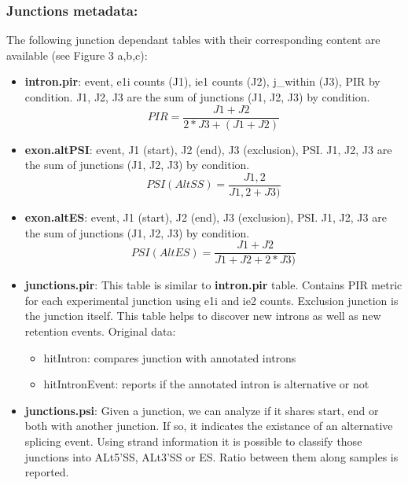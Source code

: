 \documentclass{article}
\begin{document}
\subsubsection*{Junctions metadata:}
The following junction dependant tables with their corresponding content are available (see Figure 3 a,b,c):
\begin{itemize}
\item \textbf{intron.pir}: event, e1i counts (J1), ie1 counts (J2), j\_within (J3), PIR by condition. J1, J2, J3 are the sum of junctions (J1, J2, J3) by condition.
  \[ PIR =\frac{J1+J2}{2*J3+(J1+J2)}\]

\item \textbf{exon.altPSI}: event, J1 (start), J2 (end), J3 (exclusion), PSI. J1, J2, J3 are the sum of junctions (J1, J2, J3) by condition. \\

\[ PSI(AltSS)=\frac{J1,2}{J1,2 +J3)}\]

\item \textbf{exon.altES}: event, J1 (start), J2 (end), J3 (exclusion), PSI. J1, J2, J3 are the sum of junctions (J1, J2, J3) by condition. \\

\[PSI(AltES)=\frac{J1 + J2 }{J1 + J2 +2*J3)}\]

\item \textbf{junctions.pir}: This table is similar to \textbf{intron.pir} table. Contains PIR metric for each experimental junction using e1i and ie2 counts. Exclusion junction is the junction itself. This table helps to discover new introns as well as new retention events. Original data:

\begin{itemize}
\item hitIntron: compares junction with annotated introns
\item hitIntronEvent: reports if the annotated intron is alternative or not
\end{itemize}

\item \textbf{junctions.psi}: Given a junction, we can analyze if it shares start, end or both with another junction. If so, it indicates the existance of an alternative splicing event. Using strand information it is possible to classify those junctions into ALt5'SS, ALt3'SS or ES. Ratio between them along samples is reported.
\end{itemize}  
\end{document}
